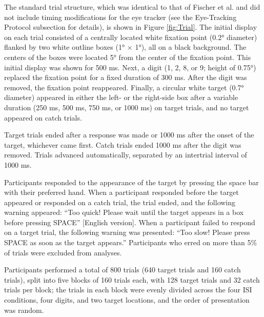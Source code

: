 \documentclass[man,floatsintext]{apa6}
\theoremstyle{definition}
\theoremstyle{definition}
\theoremstyle{definition}
\theoremstyle{remark}
\begin{document}
The standard trial structure, which was identical to that of Fischer et
al. and did not include timing modifications for the eye tracker (see
the Eye-Tracking Protocol subsection for details), is shown in Figure
\ref{fig:Trial}. The initial display on each trial consisted of a
centrally located white fixation point (0.2° diameter) flanked by two
white outline boxes (1° \(\times\) 1°), all on a black background. The
centers of the boxes were located 5° from the center of the fixation
point. This initial display was shown for 500 ms. Next, a digit (1, 2,
8, or 9; height of 0.75°) replaced the fixation point for a fixed
duration of 300 ms. After the digit was removed, the fixation point
reappeared. Finally, a circular white target (0.7° diameter) appeared in
either the left- or the right-side box after a variable duration (250
ms, 500 ms, 750 ms, or 1000 ms) on target trials, and no target appeared
on catch trials.

Target trials ended after a response was made or 1000 ms after the onset
of the target, whichever came first. Catch trials ended 1000 ms after
the digit was removed. Trials advanced automatically, separated by an
intertrial interval of 1000 ms.

Participants responded to the appearance of the target by pressing the
space bar with their preferred hand. When a participant responded before
the target appeared or responded on a catch trial, the trial ended, and
the following warning appeared: \enquote{Too quick! Please wait until
the target appears in a box before pressing SPACE} {[}English
version{]}. When a participant failed to respond on a target trial, the
following warning was presented: \enquote{Too slow! Please press SPACE
as soon as the target appears.} Participants who erred on more than 5\%
of trials were excluded from analyses.

Participants performed a total of 800 trials (640 target trials and 160
catch trials), split into five blocks of 160 trials each, with 128
target trials and 32 catch trials per block; the trials in each block
were evenly divided across the four ISI conditions, four digits, and two
target locations, and the order of presentation was random.
\end{document}
